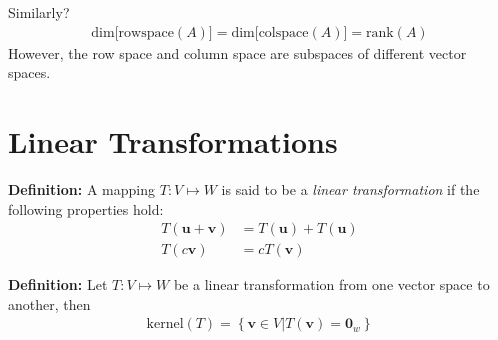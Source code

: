 \documentclass[a4paper,10pt]{report}
\newcommand{\vb}[1]{\mathbf{#1}}		%
\begin{document}
  Similarly?
  \begin{align*}
   \text{dim[rowspace}(A)] = \text{dim[colspace}(A)] = \text{rank}(A)
  \end{align*}
  However, the row space and column space are subspaces of different vector spaces.



\chapter{Linear Transformations}

\textbf{Definition: } A mapping $T: V\mapsto W$ is said to be a \textit{linear transformation} if the following properties hold:
\begin{align*}
 T(\vb{u} + \vb{v}) &= T(\vb{u}) + T(\vb{u}) \\
 T(c\vb{v}) &= cT(\vb{v})
\end{align*}

\textbf{Definition: } Let $T: V\mapsto W$ be a linear transformation from one vector space to another, then
\begin{align*}
 \text{kernel}(T)=\left\{\vb{v}\in V | T(\vb{v}) = \vb{0}_w\right\}
\end{align*}
\end{document}

